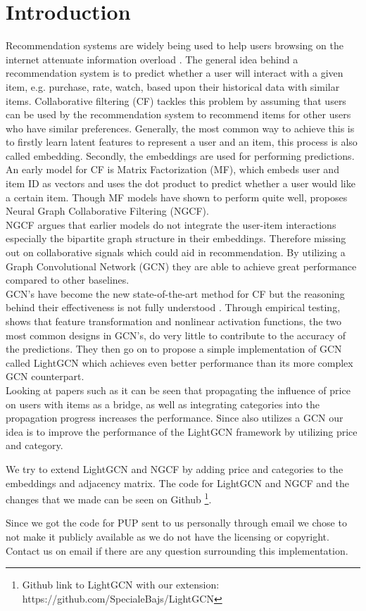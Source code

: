 \section{Introduction}
Recommendation systems are widely being used to help users browsing on the internet attenuate information overload \cite{YT_rec,Pint_rec}.
The general idea behind a recommendation system is to predict whether a user will interact with a given item, e.g. purchase, rate, watch, based upon their historical data with similar items.
Collaborative filtering (CF) tackles this problem by assuming that users can be used by the recommendation system to recommend items for other users who have similar preferences.
Generally, the most common way to achieve this is to firstly learn latent features to represent a user and an item, this process is also called embedding.
Secondly, the embeddings are used for performing predictions.
\\
An early model for CF is Matrix Factorization (MF), which embeds user and item ID as vectors and uses the dot product to predict whether a user would like a certain item.
Though MF models have shown to perform quite well, \cite{NGCF_2019} proposes Neural Graph Collaborative Filtering (NGCF).
\\
NGCF argues that earlier models do not integrate the user-item interactions especially the bipartite graph structure in their embeddings.
Therefore missing out on collaborative signals which could aid in recommendation.
By utilizing a Graph Convolutional Network (GCN) they are able to achieve great performance compared to other baselines.
\\
GCN's have become the new state-of-the-art method for CF but the reasoning behind their effectiveness is not fully understood \cite{lightgcn}.
Through empirical testing, \cite{lightgcn} shows that feature transformation and nonlinear activation functions, the two most common designs in GCN's, do very little to contribute to the accuracy of the predictions.
They then go on to propose a simple implementation of GCN called LightGCN which achieves even better performance than its more complex GCN counterpart.
\\
Looking at papers such as \cite{Priceaware} it can be seen that propagating the influence of price on users with items as a bridge, as well as integrating categories into the propagation progress increases the performance.
Since \cite{Priceaware} also utilizes a GCN our idea is to improve the performance of the LightGCN framework by utilizing price and category.

We try to extend LightGCN and NGCF by adding price and categories to the embeddings and adjacency matrix.
The code for LightGCN and NGCF and the changes that we made can be seen on Github \footnote{Github link to LightGCN with our extension: https://github.com/SpecialeBajs/LightGCN}.

Since we got the code for PUP sent to us personally through email we chose to not make it publicly available as we do not have the licensing or copyright.
Contact us on email if there are any question surrounding this implementation.
